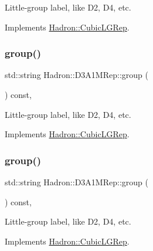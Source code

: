 Little-\/group label, like D2, D4, etc. 

Implements \mbox{\hyperlink{structHadron_1_1CubicLGRep_a9bdb14b519a611d21379ed96a3a9eb41}{Hadron\+::\+Cubic\+L\+G\+Rep}}.

\mbox{\label{structHadron_1_1D3A1MRep_a900d5acc0d3ed9cf5f3f97537f43d8e7}} 
\subsubsection{\texorpdfstring{group()}{group()}\hspace{0.1cm}{\footnotesize\ttfamily [2/3]}}
{\footnotesize\ttfamily std\+::string Hadron\+::\+D3\+A1\+M\+Rep\+::group (\begin{DoxyParamCaption}{ }\end{DoxyParamCaption}) const\hspace{0.3cm}{\ttfamily [inline]}, {\ttfamily [virtual]}}

Little-\/group label, like D2, D4, etc. 

Implements \mbox{\hyperlink{structHadron_1_1CubicLGRep_a9bdb14b519a611d21379ed96a3a9eb41}{Hadron\+::\+Cubic\+L\+G\+Rep}}.

\mbox{\label{structHadron_1_1D3A1MRep_a900d5acc0d3ed9cf5f3f97537f43d8e7}} 
\subsubsection{\texorpdfstring{group()}{group()}\hspace{0.1cm}{\footnotesize\ttfamily [3/3]}}
{\footnotesize\ttfamily std\+::string Hadron\+::\+D3\+A1\+M\+Rep\+::group (\begin{DoxyParamCaption}{ }\end{DoxyParamCaption}) const\hspace{0.3cm}{\ttfamily [inline]}, {\ttfamily [virtual]}}

Little-\/group label, like D2, D4, etc. 

Implements \mbox{\hyperlink{structHadron_1_1CubicLGRep_a9bdb14b519a611d21379ed96a3a9eb41}{Hadron\+::\+Cubic\+L\+G\+Rep}}.

\mbox{\label{structHadron_1_1D3A1MRep_ac976defff42a8379442ad25c629172c3}} 
